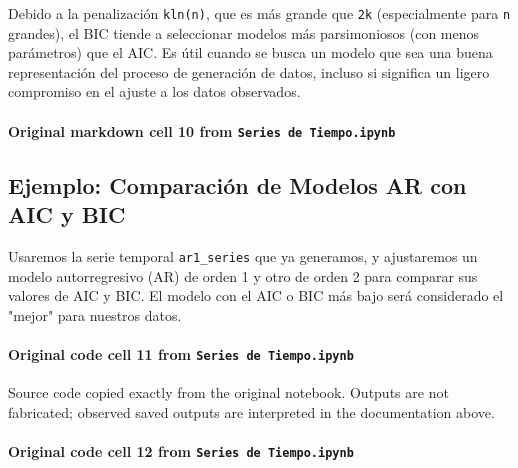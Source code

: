 \documentclass[
  11pt,
]{article}
\newenvironment{Shaded}{}{}
\begin{document}
Debido a la penalización \texttt{kln(n)}, que es más grande que \texttt{2k} (especialmente para \texttt{n} grandes), el BIC tiende a seleccionar modelos más parsimoniosos (con menos parámetros) que el AIC. Es útil cuando se busca un modelo que sea una buena representación del proceso de generación de datos, incluso si significa un ligero compromiso en el ajuste a los datos observados.

\paragraph{\texorpdfstring{Original markdown cell 10 from \texttt{Series\ de\ Tiempo.ipynb}}{Original markdown cell 10 from Series de Tiempo.ipynb}}\label{original-markdown-cell-10-from-series-de-tiempoipynb}

\subsection{Ejemplo: Comparación de Modelos AR con AIC y BIC}\label{ejemplo-comparaciuxf3n-de-modelos-ar-con-aic-y-bic}

Usaremos la serie temporal \texttt{ar1\_series} que ya generamos, y ajustaremos un modelo autorregresivo (AR) de orden 1 y otro de orden 2 para comparar sus valores de AIC y BIC. El modelo con el AIC o BIC más bajo será considerado el "mejor" para nuestros datos.

\paragraph{\texorpdfstring{Original code cell 11 from \texttt{Series\ de\ Tiempo.ipynb}}{Original code cell 11 from Series de Tiempo.ipynb}}\label{original-code-cell-11-from-series-de-tiempoipynb}

Source code copied exactly from the original notebook. Outputs are not fabricated; observed saved outputs are interpreted in the documentation above.

\begin{Shaded}
\begin{Highlighting}[]

\end{Highlighting}
\end{Shaded}

\paragraph{\texorpdfstring{Original code cell 12 from \texttt{Series\ de\ Tiempo.ipynb}}{Original code cell 12 from Series de Tiempo.ipynb}}\label{original-code-cell-12-from-series-de-tiempoipynb}
\end{document}
